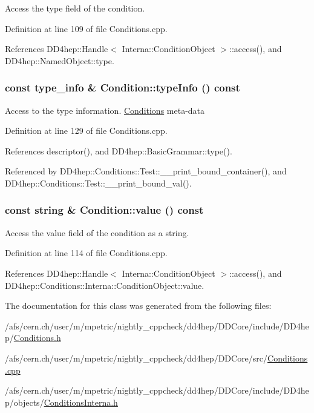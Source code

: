 Access the type field of the condition. 

Definition at line 109 of file Conditions.cpp.

References DD4hep::Handle$<$ Interna::ConditionObject $>$::access(), and DD4hep::NamedObject::type.\hypertarget{class_d_d4hep_1_1_conditions_1_1_condition_a4000e74dc8e5830d56f01b5dad0951ff}{
\subsubsection[{typeInfo}]{\setlength{\rightskip}{0pt plus 5cm}const type\_\-info \& Condition::typeInfo () const}}
\label{class_d_d4hep_1_1_conditions_1_1_condition_a4000e74dc8e5830d56f01b5dad0951ff}


Access to the type information. \hyperlink{namespace_d_d4hep_1_1_conditions}{Conditions} meta-\/data 

Definition at line 129 of file Conditions.cpp.

References descriptor(), and DD4hep::BasicGrammar::type().

Referenced by DD4hep::Conditions::Test::\_\-\_\-print\_\-bound\_\-container(), and DD4hep::Conditions::Test::\_\-\_\-print\_\-bound\_\-val().\hypertarget{class_d_d4hep_1_1_conditions_1_1_condition_a2380234fddc3c50888eaf57ae60948f0}{
\subsubsection[{value}]{\setlength{\rightskip}{0pt plus 5cm}const {\bf string} \& Condition::value () const}}
\label{class_d_d4hep_1_1_conditions_1_1_condition_a2380234fddc3c50888eaf57ae60948f0}


Access the value field of the condition as a string. 

Definition at line 114 of file Conditions.cpp.

References DD4hep::Handle$<$ Interna::ConditionObject $>$::access(), and DD4hep::Conditions::Interna::ConditionObject::value.

The documentation for this class was generated from the following files:\begin{DoxyCompactItemize}
\item 
/afs/cern.ch/user/m/mpetric/nightly\_\-cppcheck/dd4hep/DDCore/include/DD4hep/\hyperlink{_conditions_8h}{Conditions.h}\item 
/afs/cern.ch/user/m/mpetric/nightly\_\-cppcheck/dd4hep/DDCore/src/\hyperlink{_conditions_8cpp}{Conditions.cpp}\item 
/afs/cern.ch/user/m/mpetric/nightly\_\-cppcheck/dd4hep/DDCore/include/DD4hep/objects/\hyperlink{_d_d_core_2include_2_d_d4hep_2objects_2_conditions_interna_8h}{ConditionsInterna.h}\end{DoxyCompactItemize}
